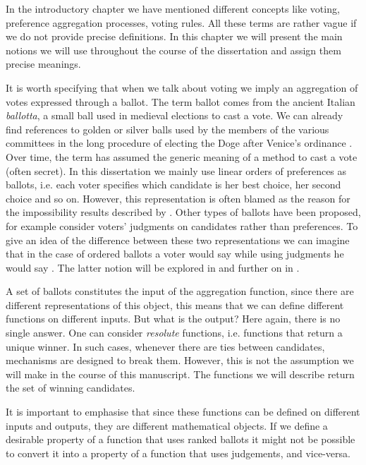 In the introductory chapter we have mentioned different concepts like voting, preference aggregation processes, voting rules. All these terms are rather vague if we do not provide precise definitions.
In this chapter we will present the main notions we will use throughout the course of the dissertation and assign them precise meanings.

It is worth specifying that when we talk about voting we imply an aggregation of votes expressed through a ballot. The term ballot comes from the ancient Italian \textit{ballotta}, a small ball used in medieval elections to cast a vote.
We can already find references to golden or silver balls used by the members of the various committees in the long procedure of electing the Doge after Venice's ordinance \citep{Doglioni1666}.
Over time, the term has assumed the generic meaning of a method to cast a vote (often secret).
In this dissertation we mainly use linear orders of preferences as ballots, i.e. each voter specifies which candidate is her best choice, her second choice and so on. However, this representation is often blamed as the reason for the impossibility results described by \citet{Arrow1950}. 
Other types of ballots have been proposed, for example \citet{Balinski2011} consider voters' judgments on candidates rather than preferences. 
To give an idea of the difference between these two representations we can imagine that in the case of ordered ballots a voter would say  while using judgments he would say .
The latter notion will be explored in  and further on in .

A set of ballots constitutes the input of the aggregation function, since there are different representations of this object, this means that we can define different functions on different inputs. But what is the output?
Here again, there is no single answer. One can consider \textit{resolute} functions, i.e. functions that return a unique winner. In such cases, whenever there are ties between candidates, mechanisms are designed to break them.
However, this is not the assumption we will make in the course of this manuscript. The functions we will describe return the set of winning candidates.

It is important to emphasise that since these functions can be defined on different inputs and outputs, they are different mathematical objects. If we define a desirable property of a function that uses ranked ballots it might not be possible to convert it into a property of a function that uses judgements, and vice-versa.

